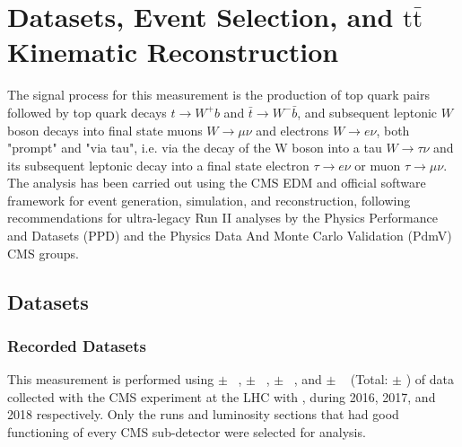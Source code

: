 
\chapter{Datasets, Event Selection, and \ensuremath{\mathrm{t\bar{t}}} Kinematic Reconstruction}
\label{Datasets_Event_Selection_Kinematic_Reconstruction}
The signal process for this measurement is the production of top quark pairs followed by top quark decays $t\to W^+ b$ and $\bar{t}\to W^- \bar{b}$, and subsequent leptonic $W$ boson decays into final state muons $W\to \mu\nu$ and electrons $W\to e\nu$, both "prompt" and "via tau", i.e. via the decay of the W boson into a tau $W\to \tau\nu$ and its subsequent leptonic decay into a final state electron $\tau\to e\nu$ or muon $\tau\to \mu\nu$.
The analysis has been carried out using the CMS EDM and official software framework for event generation, simulation, and reconstruction, following recommendations for ultra-legacy Run II analyses by the Physics Performance and Datasets (PPD) and the Physics Data And Monte Carlo Validation (PdmV) CMS groups.

\section{Datasets}

\subsection{Recorded Datasets}
This measurement is performed using \lumivalueSixPreVFP $\pm$ \lumierrSixPreVFP~\cite{bib:lumipas16}, \lumivalueSixPostVFP $\pm$ \lumierrSixPostVFP~\cite{bib:lumipas16}, \lumivalueSeven $\pm$ \lumierrSeven~\cite{bib:lumipas17}, and \lumivalueEight $\pm$ \lumierrEight~\cite{bib:lumipas18} (Total: \lumivalueRuniiUL $\pm$ \lumierrRuniiUL) of data collected with the CMS experiment at the LHC with \beamenergy, during 2016, 2017, and 2018 respectively.
Only the runs and luminosity sections that had good functioning of every CMS sub-detector were selected for analysis.


